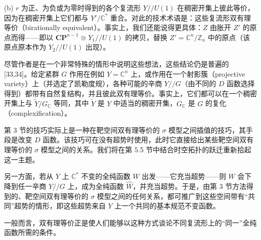 (b) $r$ 为正、为负或为零时得到的各个复流形 $Y//U(1)$ 在稠密开集上彼此等价，因为在稠密开集上它们都与 $Y'/\mathbb{C}^*$ 重合。对此的技术术语是：这些复流形双有理等价（birationally equivalent）。事实上，我们还能说得更具体：$Z$ 由胀开 $Z'$ 的原点而得——即以 $\mathbf{CP}^{n-1}\cong Y_1//U(1)$ 的拷贝，替换 $Z'=\mathbb{C}^n/\mathbb{Z}_n$ 中的原点（该原点原本作为 $Y_2//U(1)$ 出现）。



尽管作者是在一个非常特殊的情形中说明这些想法，这些结论仍是普遍的 [33,34]。给定紧群 $G$ 作用在例如 $Y=\mathbb{C}^n$ 上，或作用在一个射影簇（projective variety）上（并选定了凯勒度规），各种可能的辛商 $Y//G$（由不同的 $D$ 函数选择得到）都带有自然复结构，并且彼此双有理等价。事实上，它们都可以在一个稠密开集上与 $\tilde{Y}/G_{\mathbb{C}}$ 等同，其中 $\tilde{Y}$ 是 $Y$ 中适当的稠密开集，$G_{\mathbb{C}}$ 是 $G$ 的复化（complexification）。


第 3 节的技巧实际上是一种在靶空间双有理等价的 $\sigma$ 模型之间插值的技巧，其手段是改变 $D$ 函数。该技巧可在没有超势时使用，此时它直接给出某些靶空间双有理等价的 $\sigma$ 模型之间的关系。我们将在第 5.5 节中结合时空拓扑的跃迁重新拾起这一主题。

另一方面，若从 $Y$ 上 $\mathbb{C}^*$ 不变的全纯函数 $W$ 出发——它充当超势——则 $W$ 会下降到任一辛商 $Y//G$ 上，成为全纯函数 $\widehat{W}$，并充当超势。于是，由第 3 节方法得到的、靶空间双有理等价的 $\sigma$ 模型之间的任何关系，都可推广到这些空间带有“共同”超势的情形，即这些超势来自 $Y$ 上一个共同的基本规范不变函数。

一般而言，双有理等价正是使人们能够以这种方式谈论不同复流形上的“同一”全纯函数所需的条件。

